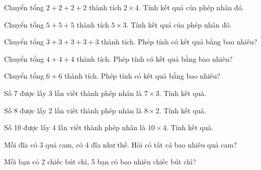 \begin{ex}
Chuyển tổng $2 + 2 + 2 + 2$ thành tích $2 \times 4$. Tính kết quả của phép nhân đó.
\end{ex}

\begin{ex}
Chuyển tổng $5 + 5 + 5$ thành tích $5 \times 3$. Tính kết quả của phép nhân đó.
\end{ex}

\begin{ex}
Chuyển tổng $3 + 3 + 3 + 3 + 3$ thành tích. Phép tính có kết quả bằng bao nhiêu?
\end{ex}

\begin{ex}
Chuyển tổng $4 + 4 + 4$ thành tích. Phép tính có kết quả bằng bao nhiêu?
\end{ex}

\begin{ex}
Chuyển tổng $6 + 6$ thành tích. Phép tính có kết quả bằng bao nhiêu?
\end{ex}

\begin{ex}
Số 7 được lấy 3 lần viết thành phép nhân là $7 \times 3$. Tính kết quả.
\end{ex}

\begin{ex}
Số 8 được lấy 2 lần viết thành phép nhân là $8 \times 2$. Tính kết quả.
\end{ex}

\begin{ex}
Số 10 được lấy 4 lần viết thành phép nhân là $10 \times 4$. Tính kết quả.
\end{ex}

\begin{ex}
Mỗi đĩa có 3 quả cam, có 4 đĩa như thế. Hỏi có tất cả bao nhiêu quả cam?
\end{ex}

\begin{ex}
Mỗi bạn có 2 chiếc bút chì, 5 bạn có bao nhiêu chiếc bút chì?
\end{ex}

